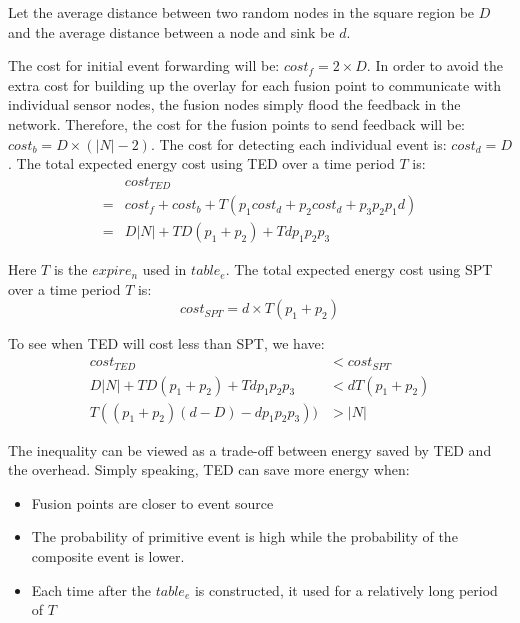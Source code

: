Let the average distance between two random nodes in the square region be \(D\) and the average distance between a node and sink be \(d\). 
\begin{comment}
Then:
\begin{equation*}
D=\frac{2+\sqrt{2}+5\times ln(1+\sqrt{}2)}{15}\times|N|
\end{equation*}
Let the average distance between the event source and the event fusion points be \(d\).
\end{comment}

The cost for initial event forwarding will be: \(cost_f=2\times D\). In order to avoid the extra cost for building up the overlay for each fusion point to communicate with individual sensor nodes, the fusion nodes simply flood the feedback in the network. Therefore, the cost for the fusion points to send feedback will be: \(cost_b=D\times(|N|-2)\). The cost for detecting each individual event is: \(cost_d=D\). The total expected energy cost using TED over a time period \(T\) is:
\begin{align*}
&cost_{TED}\\
=&cost_f+cost_b+T(p_1cost_d+p_2cost_d+p_3p_2p_1d)\\
=&D|N|+TD(p_1+p_2)+Tdp_1p_2p_3
\end{align*}

Here \(T\) is the \(expire_n\) used in \(table_e\). The total expected energy cost using SPT over a time period \(T\) is:
\begin{equation*}
cost_{SPT}=d\times T(p_1+p_2)
\end{equation*}

To see when TED will cost less than SPT, we have:
\begin{align*}
cost_{TED}&<cost_{SPT}\\
D|N|+TD(p_1+p_2)+Tdp_1p_2p_3&<dT(p_1+p_2)\\
T((p_1+p_2)(d-D)-dp_1p_2p_3))&>|N|
\end{align*}

The inequality can be viewed as a trade-off between energy saved by TED and the overhead. Simply speaking, TED can save more energy when:
\begin{itemize}
\item Fusion points are closer to event source
\item The probability of primitive event is high while the probability of the composite event is lower.
\item Each time after the \(table_e\) is constructed, it used for a relatively long period of \(T\) 
\end{itemize}
